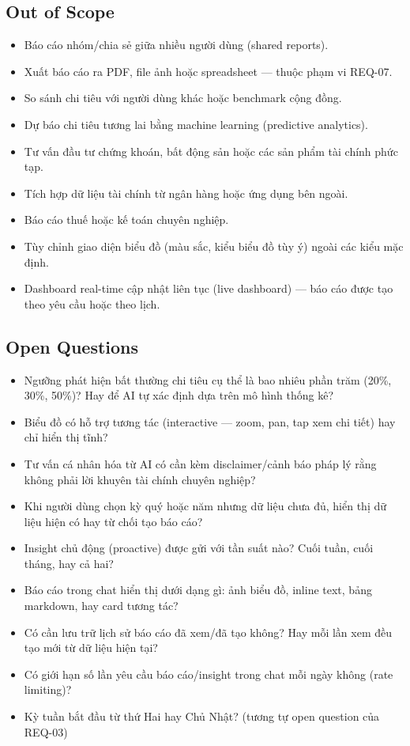 \subsection{Out of Scope}

\begin{itemize}
\item Báo cáo nhóm/chia sẻ giữa nhiều người dùng (shared reports).
\item Xuất báo cáo ra PDF, file ảnh hoặc spreadsheet — thuộc phạm vi REQ-07.
\item So sánh chi tiêu với người dùng khác hoặc benchmark cộng đồng.
\item Dự báo chi tiêu tương lai bằng machine learning (predictive analytics).
\item Tư vấn đầu tư chứng khoán, bất động sản hoặc các sản phẩm tài chính phức tạp.
\item Tích hợp dữ liệu tài chính từ ngân hàng hoặc ứng dụng bên ngoài.
\item Báo cáo thuế hoặc kế toán chuyên nghiệp.
\item Tùy chỉnh giao diện biểu đồ (màu sắc, kiểu biểu đồ tùy ý) ngoài các kiểu mặc định.
\item Dashboard real-time cập nhật liên tục (live dashboard) — báo cáo được tạo theo yêu cầu hoặc theo lịch.
\end{itemize}
\subsection{Open Questions}

\begin{itemize}
\item [ ] Ngưỡng phát hiện bất thường chi tiêu cụ thể là bao nhiêu phần trăm (20\%, 30\%, 50\%)? Hay để AI tự xác định dựa trên mô hình thống kê?
\item [ ] Biểu đồ có hỗ trợ tương tác (interactive — zoom, pan, tap xem chi tiết) hay chỉ hiển thị tĩnh?
\item [ ] Tư vấn cá nhân hóa từ AI có cần kèm disclaimer/cảnh báo pháp lý rằng không phải lời khuyên tài chính chuyên nghiệp?
\item [ ] Khi người dùng chọn kỳ quý hoặc năm nhưng dữ liệu chưa đủ, hiển thị dữ liệu hiện có hay từ chối tạo báo cáo?
\item [ ] Insight chủ động (proactive) được gửi với tần suất nào? Cuối tuần, cuối tháng, hay cả hai?
\item [ ] Báo cáo trong chat hiển thị dưới dạng gì: ảnh biểu đồ, inline text, bảng markdown, hay card tương tác?
\item [ ] Có cần lưu trữ lịch sử báo cáo đã xem/đã tạo không? Hay mỗi lần xem đều tạo mới từ dữ liệu hiện tại?
\item [ ] Có giới hạn số lần yêu cầu báo cáo/insight trong chat mỗi ngày không (rate limiting)?
\item [ ] Kỳ tuần bắt đầu từ thứ Hai hay Chủ Nhật? (tương tự open question của REQ-03)
\end{itemize}
